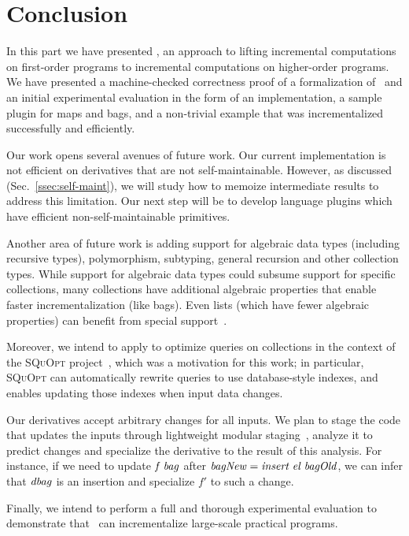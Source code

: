 \chapter{Conclusion}
\label{ssec:future}
In this part we have presented \ILC, an approach to lifting incremental computations
on first-order programs to incremental computations on higher-order
programs. We have presented a machine-checked correctness proof 
of a formalization of \ILC\ and an initial experimental evaluation
in the form of an implementation, a sample plugin for maps and bags,
and a non-trivial example that was incrementalized successfully and
efficiently. 

Our work opens several avenues of future work. Our current implementation
is not efficient on derivatives that are not self-maintainable.
However, as discussed
(Sec.~\ref{ssec:self-maint}), we will study how
to memoize intermediate results to address this limitation. Our next
step will be to develop language plugins which
have efficient non-self-maintainable primitives.

Another area of future work is adding support for algebraic data
types (including recursive types), polymorphism, subtyping, general recursion
and other collection types. While support for algebraic data
types could subsume support for specific collections, many
collections have additional algebraic properties that enable faster
incrementalization (like bags). Even lists (which have fewer algebraic properties)
can benefit from special support~\citep{Maier2013}.

Moreover, we intend to apply \ILC{} to optimize queries on
collections in the context of the \textsc{SQuOpt}
project~\citep{GiarrussoAOSD13}, which was a motivation for this
work; in particular, \textsc{SQuOpt} can automatically rewrite
queries to use database-style indexes, and \ILC{} enables
updating those indexes when input data changes.

\begin{oldSec}
Our derivatives accept arbitrary changes for all inputs. We plan
to stage the code that updates the inputs through lightweight
modular staging~\citep{rompf2010lightweight}, analyze it to
predict changes and specialize the derivative to the result of
this analysis. For instance, if we need to update $\mathit{f} \;
\mathit{bag}$ after $\mathit{bagNew} = \mathit{insert} \; \mathit{el} \;
\mathit{bagOld}$, we can infer that $\mathit{dbag}$ is an insertion
and specialize $f'$ to such a change.
\end{oldSec}

Finally, we intend to perform a full and thorough experimental evaluation
to demonstrate that \ILC\ can incrementalize large-scale practical programs.
